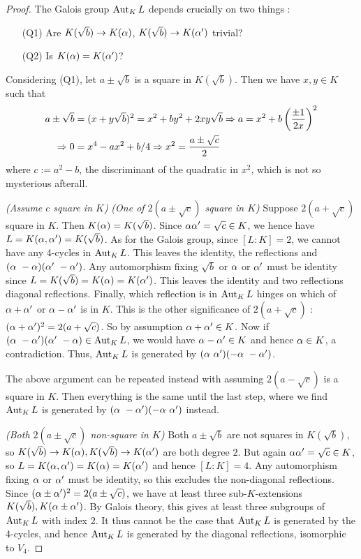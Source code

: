 \documentclass{article}
\begin{document}
\begin{proof}
  The Galois group $\operatorname{Aut}_K L$ depends crucially on two things : 
  \begin{enumerate}
    \item [(Q1)] Are $K(\sqrt{b}) \to K(\alpha)$, 
    $K(\sqrt{b}) \to K(\alpha')$ trivial?
    \item [(Q2)] Is $K(\alpha) = K(\alpha')$?
  \end{enumerate} 
  Considering (Q1), let $a \pm \sqrt{b}$ is a square in $K(\sqrt{b})$.
  Then we have $x, y \in K$ such that 
  \begin{align*}
    a \pm \sqrt{b} 
    &= (x + y \sqrt{b})^2 = x^2 + b y^2 + 2 xy \sqrt{b} 
    \Rightarrow a = x^2 + b\left(\frac{\pm 1}{2x}\right)^2 \\
    \Rightarrow 0 &= x^4 - a x^2 + b/4 
    \Rightarrow x^2 = \frac{a \pm \sqrt{c}}{2}
  \end{align*}
  where $c := a^2 - b$, the discriminant of the quadratic in $x^2$,
  which is not so mysterious afterall.

  \textit{(Assume $c$ square in $K$)}
  \textit{(One of $2(a \pm \sqrt{c})$ square in $K$)}
  Suppose $2(a + \sqrt{c})$ square in $K$.
  Then $K(\alpha) = K(\sqrt{b})$.
  Since $\alpha \alpha' = \sqrt{c} \in K$, 
  we hence have $L = K(\alpha,\alpha') = K(\sqrt{b})$.
  As for the Galois group, 
  since $[L : K] = 2$, we cannot have any 4-cycles in $\operatorname{Aut}_K L$.
  This leaves the identity, 
  the reflections and $(\alpha \,\, -\alpha) (\alpha' \,\, -\alpha')$.
  Any automorphism fixing $\sqrt{b}$ or $\alpha$ or $\alpha'$ 
  must be identity since $L = K(\sqrt{b}) = K(\alpha) = K(\alpha')$.
  This leaves the identity and 
  two reflections diagonal reflections.
  Finally, which reflection is in $\operatorname{Aut}_K L$ hinges on 
  which of $\alpha + \alpha'$ or $\alpha - \alpha'$ is in $K$.
  This is the other significance of $2(a + \sqrt{c})$ : 
  $(\alpha + \alpha')^2 = 2(a + \sqrt{c})$.
  So by assumption $\alpha + \alpha' \in K$.
  Now if $(\alpha \,\,-\alpha') (\alpha' \,\, -\alpha) \in \operatorname{Aut}_K L$,
  we would have $\alpha - \alpha' \in K$ and hence $\alpha \in K$, a contradiction.
  Thus, $\operatorname{Aut}_K L$ is generated by $(\alpha \,\,\alpha') (-\alpha \,\, -\alpha')$.

  The above argument can be repeated instead with assuming 
  $2(a - \sqrt{c})$ is a square in $K$.
  Then everything is the same until the last step, 
  where we find $\operatorname{Aut}_K L$ is generated by $(\alpha \,\, -\alpha') (-\alpha \,\, \alpha')$
  instead. 

  \textit{(Both $2(a \pm \sqrt{c})$ non-square in $K$)}
  Both $a \pm \sqrt{b}$ are not squares in $K(\sqrt{b})$,
  so $K(\sqrt{b}) \to K(\alpha), K(\sqrt{b}) \to K(\alpha')$ are both degree $2$.
  But again $\alpha \alpha' = \sqrt{c} \in K$, 
  so $L = K(\alpha,\alpha') = K(\alpha) = K(\alpha')$ and hence $[L : K] = 4$.
  Any automorphism fixing $\alpha$ or $\alpha'$ must be identity,
  so this excludes the non-diagonal reflections.
  Since $(\alpha \pm \alpha')^2 = 2(a \pm \sqrt{c})$,
  we have at least three sub-$K$-extensions $K(\sqrt{b}),K(\alpha \pm \alpha')$.
  By Galois theory, this gives at least three subgroups of $\operatorname{Aut}_K L$
  with index $2$.
  It thus cannot be the case that $\operatorname{Aut}_K L$ is generated by 
  the 4-cycles,
  and hence $\operatorname{Aut}_K L$ is generated by the diagonal reflections,
  isomorphic to $V_4$.


\end{proof}
\end{document}
